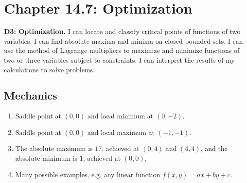 \fancyhead[R]{\daytwelve/\daythirteen}

\section*{\centering Chapter 14.7: Optimization}

\textbf{D3: Optimization.} I can locate and classify critical points of functions of two variables. I can find absolute maxima and minima on closed bounded sets. I can use the method of Lagrange multipliers to maximize and minimize functions of two or three variables subject to constraints. I can interpret the results of my calculations to solve problems.

\subsection*{Mechanics}
\begin{enumerate}	
	\item {}
    {%
        Saddle point at $(0,0)$ and local minimum at $(0,-2)$.
    }
    {%
    } 
    \item {}
    {%
        Saddle point at $(0,0)$ and local maximum at $(-1,-1)$.
    }
    {%
    } 
    \item {}
    {%
        The absolute maximum is $17$, achieved at $(0,4)$ and $(4,4)$, and the absolute minimum is $1$, achieved at $(0,0)$.
    }
    {%
    } 
    \item {}
    {%
        Many possible examples, e.g. any linear function $f(x,y)=ax+by+c$.
    }
    {%
    } 
\end{enumerate}

